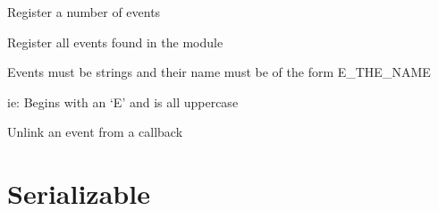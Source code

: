 \documentclass[letterpaper,10pt,english]{sphinxmanual}
\begin{document}
\begin{fulllineitems}
\begin{fulllineitems}
\label{common:serge.common.EventAware.registerEvents}
Register a number of events

\end{fulllineitems}


\begin{fulllineitems}
\label{common:serge.common.EventAware.registerEventsFromModule}
Register all events found in the module

Events must be strings and their name must be of the 
form E\_THE\_NAME

ie: Begins with an `E' and is all uppercase

\end{fulllineitems}


\begin{fulllineitems}
\label{common:serge.common.EventAware.unlinkEvent}
Unlink an event from a callback

\end{fulllineitems}


\end{fulllineitems}



\section{Serializable}
\label{common:serializable}
\end{document}
